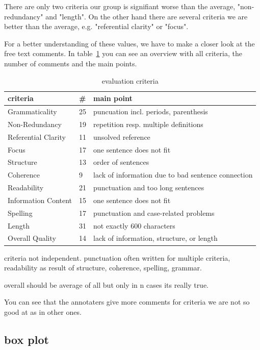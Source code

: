 There are only two criteria our group is signifiant worse than the average, "non-redundancy" and "length". On the other hand there are several criteria we are better than the average, e.g. "referential clarity" or "focus".

For a better understanding of these values, we have to make a closer look at the free text comments.
In table~\ref{tab:evacomments} you can see an overview with all criteria, the number of comments and the main points.

\begin{table}[H]
	\begin{tabularx}{\textwidth}{llX} \toprule
		criteria & \# & main point \\ \midrule
		Grammaticality      & 25 & puncuation incl. periods, parenthesis  \\
		Non-Redundancy      & 19 & repetition resp. multiple definitions \\
		Referential Clarity & 11 & unsolved reference \\
		Focus               & 17 & one sentence does not fit \\
		Structure           & 13 & order of sentences \\
		Coherence           & 9  & lack of information due to bad sentence connection \\
		Readability         & 21 & punctuation and too long sentences \\
		Information Content & 15 & one sentence does not fit \\
		Spelling            & 17 & punctuation and case-related problems \\
		Length              & 31 & not exactly 600 characters \\
		Overall Quality     & 14 & lack of information, structure, or length \\ \bottomrule
	\end{tabularx}
	\caption{evaluation criteria}
	\label{tab:evacomments}
\end{table}

criteria not independent.
punctuation often written for multiple criteria, readability as result of structure, coherence, spelling, grammar.

overall should be average of all but only in n cases its really true.

You can see that the annotaters give more comments for criteria we are not so good at as in other ones.


\subsection{box plot}

